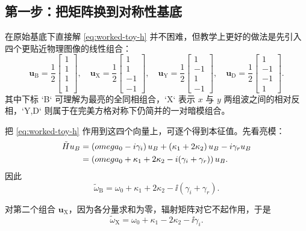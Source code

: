\subsection{第一步：把矩阵换到对称性基底}
在原始基底下直接解 \cref{eq:worked-toy-h} 并不困难，但教学上更好的做法是先引入四个更贴近物理图像的线性组合：
\begin{equation}
\bm{u}_{\mathrm{B}}
=
\frac{1}{2}
\begin{bmatrix}
1\\1\\1\\1
\end{bmatrix},
\quad
\bm{u}_{\mathrm{X}}
=
\frac{1}{2}
\begin{bmatrix}
1\\1\\-1\\-1
\end{bmatrix},
\quad
\bm{u}_{\mathrm{Y}}
=
\frac{1}{2}
\begin{bmatrix}
1\\-1\\1\\-1
\end{bmatrix},
\quad
\bm{u}_{\mathrm{D}}
=
\frac{1}{2}
\begin{bmatrix}
1\\-1\\-1\\1
\end{bmatrix}.
\label{eq:worked-sym-basis}
\end{equation}
其中下标 `B` 可理解为最亮的全同相组合，`X` 表示 $x$ 与 $y$ 两组波之间的相对反相，`Y,D` 则属于在完美方格对称下仍简并的一对暗模组合。

把 \cref{eq:worked-toy-h} 作用到这四个向量上，可逐个得到本征值。先看亮模：
\begin{align}
\tilde{H}u_{B}
&=
\left(omega_0-i\gamma_i\right)u_{B}
+
\left(\kappa_1+2\kappa_2\right)u_{B}
-i\gamma_r u_{B} \notag\\
&=
\left(omega_0+\kappa_1+2\kappa_2-i(\gamma_i+\gamma_r)\right)u_{B}.
\end{align}
因此
\begin{equation}
\tilde{\omega}_{\mathrm{B}}
=
\omega_0+\kappa_1+2\kappa_2-\ii(\gamma_i+\gamma_r).
\label{eq:worked-bright}
\end{equation}

对第二个组合 $\bm{u}_{\mathrm{X}}$，因为各分量求和为零，辐射矩阵对它不起作用，于是
\begin{equation}
\tilde{\omega}_{\mathrm{X}}
=
\omega_0+\kappa_1-2\kappa_2-\ii\gamma_i.
\label{eq:worked-x}
\end{equation}

